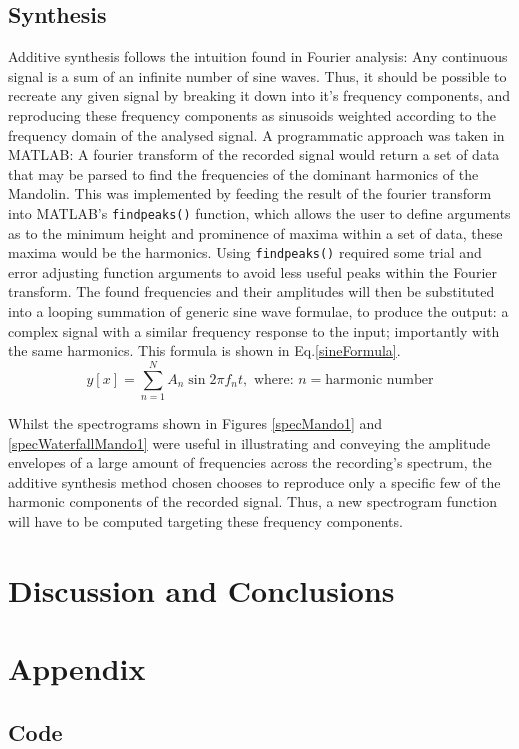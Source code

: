 \documentclass{article}
\begin{document}
        



    \subsection{Synthesis}
        Additive synthesis follows the intuition found in Fourier analysis: Any continuous signal is a sum of an infinite number of sine waves.
        Thus, it should be possible to recreate any given signal by breaking it down into it's frequency components, and reproducing these frequency components as sinusoids weighted according to the frequency domain of the analysed signal.
        A programmatic approach was taken in MATLAB: A fourier transform of the recorded signal would return a set of data that may be parsed to find the frequencies of the dominant harmonics of the Mandolin.
        This was implemented by feeding the result of the fourier transform into MATLAB's \texttt{findpeaks()} function, which allows the user to define arguments as to the minimum height and prominence of maxima within a set of data, these maxima would be the harmonics.
        Using \texttt{findpeaks()} required some trial and error adjusting function arguments to avoid less useful peaks within the Fourier transform.
        The found frequencies and their amplitudes will then be substituted into a looping summation of generic sine wave formulae, to produce the output: a complex signal with a similar frequency response to the input; importantly with the same harmonics.
        This formula is shown in Eq.\ref{sineFormula}.
        \begin{equation}
            y[x] = \sum_{n=1}^{N} A_n \sin{2 \pi f_n t}, \text{ where: } n = \text{harmonic number}
            \label{sineFormula}
        \end{equation}

        
        Whilst the spectrograms shown in Figures \ref{specMando1} and \ref{specWaterfallMando1} were useful in illustrating and conveying the amplitude envelopes of a large amount of frequencies across the recording's spectrum, the additive synthesis method chosen chooses to reproduce only a specific few of the harmonic components of the recorded signal.
        Thus, a new spectrogram function will have to be computed targeting these frequency components.
\section{Discussion and Conclusions}
\section{Appendix}
\subsection{Code}





\end{document}
